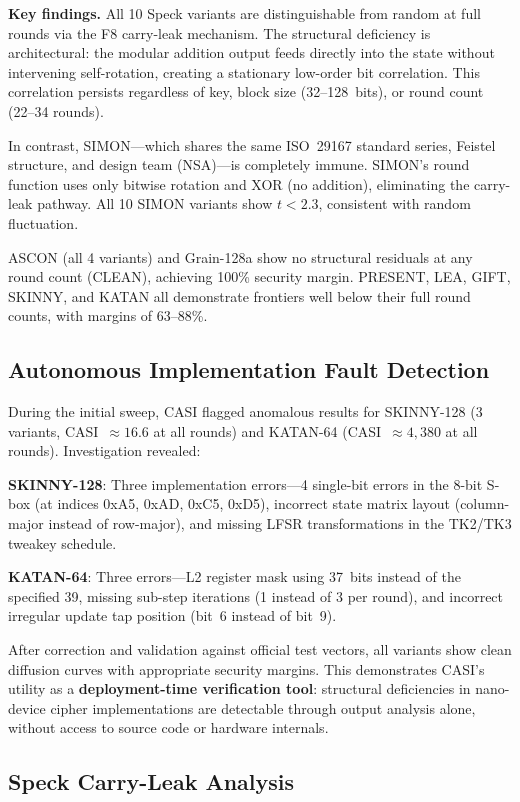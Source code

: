 \documentclass[conference]{IEEEtran}
\begin{document}
\textbf{Key findings.}
All 10 Speck variants are distinguishable from random at full rounds via the F8 carry-leak mechanism.
The structural deficiency is architectural: the modular addition output feeds directly into the state without intervening self-rotation, creating a stationary low-order bit correlation.
This correlation persists regardless of key, block size (32--128~bits), or round count (22--34 rounds).

In contrast, SIMON---which shares the same ISO~29167 standard series, Feistel structure, and design team (NSA)---is completely immune.
SIMON's round function uses only bitwise rotation and XOR (no addition), eliminating the carry-leak pathway.
All 10 SIMON variants show $t < 2.3$, consistent with random fluctuation.

ASCON (all 4 variants) and Grain-128a show no structural residuals at any round count (CLEAN), achieving 100\% security margin.
PRESENT, LEA, GIFT, SKINNY, and KATAN all demonstrate frontiers well below their full round counts, with margins of 63--88\%.

\subsection{Autonomous Implementation Fault Detection}

During the initial sweep, CASI flagged anomalous results for SKINNY-128 (3 variants, CASI~$\approx 16.6$ at all rounds) and KATAN-64 (CASI~$\approx 4{,}380$ at all rounds).
Investigation revealed:

\textbf{SKINNY-128}: Three implementation errors---4 single-bit errors in the 8-bit S-box (at indices 0xA5, 0xAD, 0xC5, 0xD5), incorrect state matrix layout (column-major instead of row-major), and missing LFSR transformations in the TK2/TK3 tweakey schedule.

\textbf{KATAN-64}: Three errors---L2 register mask using 37~bits instead of the specified 39, missing sub-step iterations (1 instead of 3 per round), and incorrect irregular update tap position (bit~6 instead of bit~9).

After correction and validation against official test vectors, all variants show clean diffusion curves with appropriate security margins.
This demonstrates CASI's utility as a \textbf{deployment-time verification tool}: structural deficiencies in nano-device cipher implementations are detectable through output analysis alone, without access to source code or hardware internals.

\subsection{Speck Carry-Leak Analysis}
\end{document}
